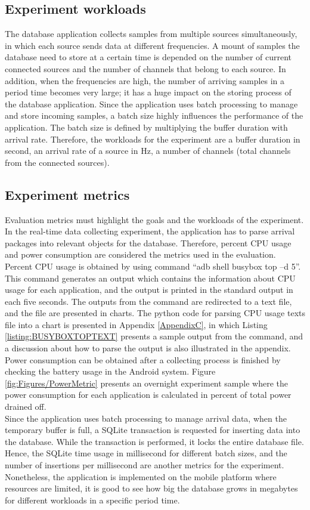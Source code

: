 \subsection{Experiment workloads}
The database application collects samples from multiple sources simultaneously, in which each source sends data at different frequencies. A mount of samples the database need to store at a certain time is depended on the number of current connected sources and the number of channels that belong to each source. In addition, when the frequencies are high, the number of arriving samples in a period time becomes very large; it has a huge impact on the storing process of the database application. Since the application uses batch processing to manage and store incoming samples, a batch size highly influences the performance of the application. The batch size is defined by multiplying the buffer duration with arrival rate. Therefore, the workloads for the experiment are a buffer duration in second, an arrival rate of a source in Hz, a number of channels (total channels from the connected sources).
\subsection{Experiment metrics}
Evaluation metrics must highlight the goals and the workloads of the experiment. In the real-time data collecting experiment, the application has to parse arrival packages into relevant objects for the database. Therefore, percent CPU usage and power consumption are considered the metrics used in the evaluation. Percent CPU usage is obtained by using command “adb shell busybox top –d 5”. This command generates an output which contains the information about CPU usage for each application, and the output is printed in the standard output in each five seconds. The outputs from the command are redirected to a text file, and the file are presented in charts. The python code for parsing CPU usage texts file into a chart is presented in Appendix \ref{AppendixC}, in which Listing \ref{listing:BUSYBOXTOPTEXT} presents a sample output from the command, and a discussion about how to parse the output is also illustrated in the appendix. Power consumption can be obtained after a collecting process is finished by checking the battery usage in the Android system. Figure \ref{fig:Figures/PowerMetric} presents an overnight experiment sample where the power consumption for each application is calculated in percent of total power drained off.\\
Since the application uses batch processing to manage arrival data, when the temporary buffer is full, a SQLite transaction is requested for inserting data into the database. While the transaction is performed, it locks the entire database file. Hence, the SQLite time usage in millisecond for different batch sizes, and the number of insertions per millisecond are another metrics for the experiment. Nonetheless, the application is implemented on the mobile platform where resources are limited, it is good to see how big the database grows in megabytes for different workloads in a specific period time.
